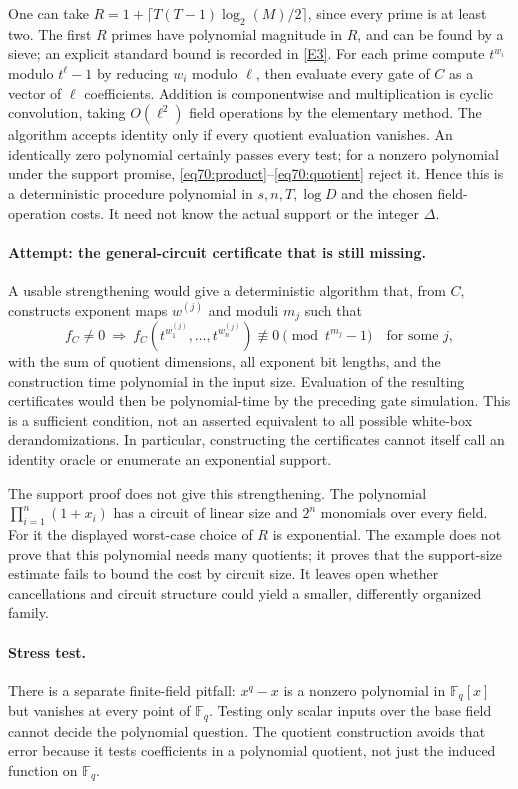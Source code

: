 \documentclass[11pt,a4paper]{article}
\numberwithin{equation}{section}
\newcommand{\F}{\mathbb{F}}
\newcommand{\eref}[2]{\hyperlink{extra:#1:#2}{[E#2]}}
\begin{document}
One can take
$R=1+\lceil T(T-1)\log_2(M)/2\rceil$, since every prime is at least two.
The first $R$ primes have polynomial magnitude in $R$, and can be found by
a sieve; an explicit standard bound is recorded in \eref{30006708}{3}.
For each prime compute $t^{w_i}$ modulo $t^\ell-1$ by reducing $w_i$
modulo $\ell$, then evaluate every gate of $C$ as a vector of $\ell$
coefficients. Addition is componentwise and multiplication is cyclic
convolution, taking $O(\ell^2)$ field operations by the elementary method.
The algorithm accepts identity only if every quotient evaluation vanishes.
An identically zero polynomial certainly passes every test; for a nonzero
polynomial under the support promise, \eqref{eq70:product}--\eqref{eq70:quotient}
reject it. Hence this is a deterministic procedure polynomial in
$s,n,T,\log D$ and the chosen field-operation costs. It need not know the
actual support or the integer $\Delta$.

\paragraph{Attempt: the general-circuit certificate that is still missing.}
A usable strengthening would give a deterministic algorithm that, from $C$,
constructs exponent maps $w^{(j)}$ and moduli $m_j$ such that
\[
 f_C\ne0\ \Longrightarrow\
 f_C(t^{w^{(j)}_1},\ldots,t^{w^{(j)}_n})
          \not\equiv0\pmod{t^{m_j}-1}\quad\text{for some }j,
\]
with the sum of quotient dimensions, all exponent bit lengths, and the
construction time polynomial in the input size. Evaluation of the resulting
certificates would then be polynomial-time by the preceding gate simulation.
This is a sufficient condition, not an asserted equivalent to all possible
white-box derandomizations. In particular, constructing the certificates
cannot itself call an identity oracle or enumerate an exponential support.

The support proof does not give this strengthening. The polynomial
$\prod_{i=1}^n(1+x_i)$ has a circuit of linear size and $2^n$ monomials
over every field. For it the displayed worst-case choice of $R$ is
exponential. The example does not prove that this polynomial needs many
quotients; it proves that the support-size estimate fails to bound the
cost by circuit size. It leaves open whether cancellations and circuit
structure could yield a smaller, differently organized family.

\paragraph{Stress test.}
There is a separate finite-field pitfall: $x^q-x$ is a nonzero polynomial
in $\F_q[x]$ but vanishes at every point of $\F_q$. Testing only scalar
inputs over the base field cannot decide the polynomial question. The
quotient construction avoids that error because it tests coefficients in
a polynomial quotient, not just the induced function on $\F_q$.
\end{document}
